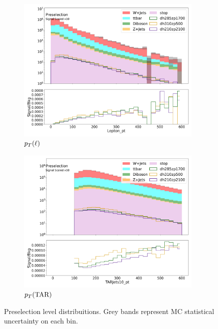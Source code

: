 \begin{figure}[htbp]
\begin{subfigure}{0.49\textwidth}
      \includegraphics[width = 0.98\textwidth]{Figures/appendix/Preselection/Lepton_pt.png}
      \caption{$p_T(\ell)$}
      \end{subfigure}
      \begin{subfigure}{0.49\textwidth}
      \includegraphics[width = 0.98\textwidth]{Figures/appendix/Preselection/TARJets10_pt.png}
      \caption{$p_T(\text{TAR})$}
      \end{subfigure}
      \caption{Preselection level distribuitions. Grey bands represent MC statistical uncertainty on each bin.}
      \label{fig:Presel2}
    \end{figure}

